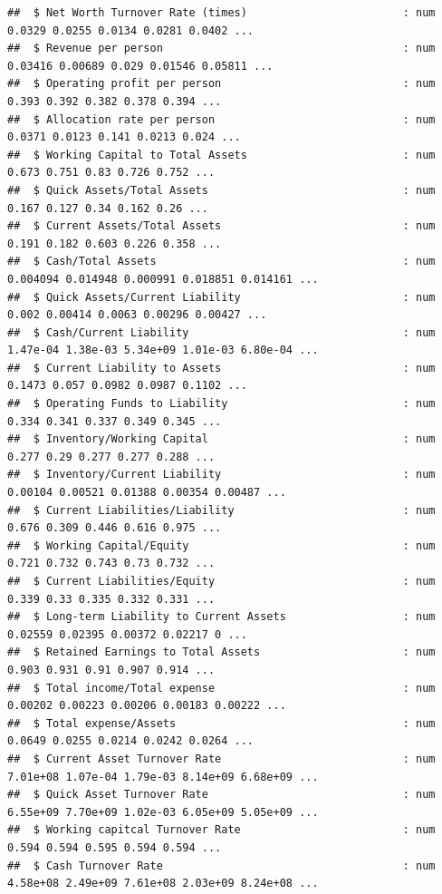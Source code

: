 \documentclass[
]{book}
\begin{document}
\begin{verbatim}
##  $ Net Worth Turnover Rate (times)                        : num  0.0329 0.0255 0.0134 0.0281 0.0402 ...
##  $ Revenue per person                                     : num  0.03416 0.00689 0.029 0.01546 0.05811 ...
##  $ Operating profit per person                            : num  0.393 0.392 0.382 0.378 0.394 ...
##  $ Allocation rate per person                             : num  0.0371 0.0123 0.141 0.0213 0.024 ...
##  $ Working Capital to Total Assets                        : num  0.673 0.751 0.83 0.726 0.752 ...
##  $ Quick Assets/Total Assets                              : num  0.167 0.127 0.34 0.162 0.26 ...
##  $ Current Assets/Total Assets                            : num  0.191 0.182 0.603 0.226 0.358 ...
##  $ Cash/Total Assets                                      : num  0.004094 0.014948 0.000991 0.018851 0.014161 ...
##  $ Quick Assets/Current Liability                         : num  0.002 0.00414 0.0063 0.00296 0.00427 ...
##  $ Cash/Current Liability                                 : num  1.47e-04 1.38e-03 5.34e+09 1.01e-03 6.80e-04 ...
##  $ Current Liability to Assets                            : num  0.1473 0.057 0.0982 0.0987 0.1102 ...
##  $ Operating Funds to Liability                           : num  0.334 0.341 0.337 0.349 0.345 ...
##  $ Inventory/Working Capital                              : num  0.277 0.29 0.277 0.277 0.288 ...
##  $ Inventory/Current Liability                            : num  0.00104 0.00521 0.01388 0.00354 0.00487 ...
##  $ Current Liabilities/Liability                          : num  0.676 0.309 0.446 0.616 0.975 ...
##  $ Working Capital/Equity                                 : num  0.721 0.732 0.743 0.73 0.732 ...
##  $ Current Liabilities/Equity                             : num  0.339 0.33 0.335 0.332 0.331 ...
##  $ Long-term Liability to Current Assets                  : num  0.02559 0.02395 0.00372 0.02217 0 ...
##  $ Retained Earnings to Total Assets                      : num  0.903 0.931 0.91 0.907 0.914 ...
##  $ Total income/Total expense                             : num  0.00202 0.00223 0.00206 0.00183 0.00222 ...
##  $ Total expense/Assets                                   : num  0.0649 0.0255 0.0214 0.0242 0.0264 ...
##  $ Current Asset Turnover Rate                            : num  7.01e+08 1.07e-04 1.79e-03 8.14e+09 6.68e+09 ...
##  $ Quick Asset Turnover Rate                              : num  6.55e+09 7.70e+09 1.02e-03 6.05e+09 5.05e+09 ...
##  $ Working capitcal Turnover Rate                         : num  0.594 0.594 0.595 0.594 0.594 ...
##  $ Cash Turnover Rate                                     : num  4.58e+08 2.49e+09 7.61e+08 2.03e+09 8.24e+08 ...

\end{verbatim}
\end{document}
